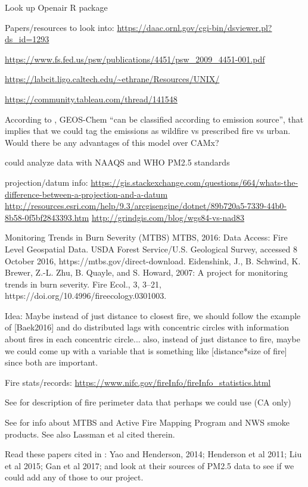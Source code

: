 Look up Openair R package

Papers/resources to look into: \url{https://daac.ornl.gov/cgi-bin/dsviewer.pl?ds_id=1293}

\url{https://www.fs.fed.us/psw/publications/4451/psw_2009_4451-001.pdf}

\url{https://labcit.ligo.caltech.edu/~ethrane/Resources/UNIX/}

\url{https://community.tableau.com/thread/141548}

According to \cite{liu_particulate_2016}, GEOS-Chem ``can be classified according to emission source'', that implies that we could tag the emissions as wildfire vs prescribed fire vs urban. Would there be any advantages of this model over CAMx?

could analyze data with NAAQS and WHO PM2.5 standards

projection/datum info: \url{https://gis.stackexchange.com/questions/664/whats-the-difference-between-a-projection-and-a-datum}
\url{http://resources.esri.com/help/9.3/arcgisengine/dotnet/89b720a5-7339-44b0-8b58-0f5bf2843393.htm}
\url{http://grindgis.com/blog/wgs84-vs-nad83}

Monitoring Trends in Burn Severity (MTBS) MTBS, 2016: Data Access: Fire Level Geospatial Data. USDA Forest Service/U.S. Geological Survey, accessed 8 October 2016, https://mtbs.gov/direct-download. 
Eidenshink, J., B. Schwind, K. Brewer, Z.-L. Zhu, B. Quayle, and S. Howard, 2007: A project for monitoring trends in burn severity. Fire Ecol., 3, 3–21, https://doi.org/10.4996/fireecology.0301003. 

Idea: Maybe instead of just distance to closest fire, we should follow the example of [Baek2016] and do distributed lags with concentric circles with information about fires in each concentric circle... also, instead of just distance to fire, maybe we could come up with a variable that is something like [distance*size of fire] since both are important.

Fire stats/records: \url{https://www.nifc.gov/fireInfo/fireInfo_statistics.html}

See \cite{adelaine_assessment_2017} for description of fire perimeter data that perhaps we could use (CA only)

See \cite{vaidyanathan_developing_2018} for info about MTBS and Active Fire Mapping Program and NWS smoke products. See also Lassman et al \cite{lassman_spatial_2017} cited therein.

Read these papers cited in \cite{lassman_spatial_2017}: Yao and Henderson, 2014; Henderson et al 2011; Liu et al 2015; Gan et al 2017; and look at their sources of PM2.5 data to see if we could add any of those to our project.

